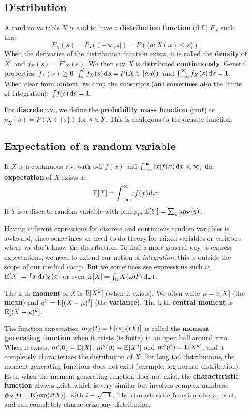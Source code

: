 \documentclass[twoside]{article}
\begin{document}
\subsection{Distribution}
A random variable $X$ is said to have a \textbf{distribution function} (d.f.) $F_X$
such that \[ F_X(s) = P_X((-\infty, s])=P(\{a: X(a)\leq s\}).\] When the derivative of the
distribution function exists, it is called the \textbf{density} of $X$, and
$f_X(s)=F'_X(s)$. We then say $X$ is distributed \textbf{continuously}. General
properties: $f_X(s)\geq0$, $\int_a^b f_X(s)\rd s = P(X\in[a,b])$, and
$\int_{-\infty}^\infty f_X(s) \rd s = 1$. When clear from context, we drop the
subscripts (and sometimes also the limits of integration): $\int\! f(s)\rd s=1$.

For \textbf{discrete} r.v., we define the \textbf{probability mass function} (pmf) as
$p_X(s) = P(X\in\{s\})$ for $s\in\mathcal{S}$. This is analogous to the density function.

\subsection{Expectation of a random variable}
If $X$ is a continuous r.v.
with pdf $f(x)$ and 
\(\int_{-\infty}^\infty |x|f(x) \rd x < \infty,\)
the \textbf{expectation} of $X$ exists as  
\[\E[X] = \int_{-\infty}^\infty xf(x) \rd x.\]
If $Y$ is a discrete random variable with pmf $p_Y$, 
$\operatorname{E}[Y]=\sum_y yp_Y(y)$.

Having different expressions for discrete and continuous random variables is awkward, since
sometimes we need to do theory for mixed variables or variables where we don't know the 
distribution. To find a more general way to express expectations, we need to extend
our notion of \emph{integration}, this is outside the scope of our method camp. But we sometimes
see expressions such at $\E[X]=\int\! x \rd F_X(x)$
or even $E[X]=\int_\Omega X(\omega) P(\rd \omega)$.

The k-th \textbf{moment} of $X$ is $\operatorname{E} [X^k]$ (when it exists).  We often write $\mu=\operatorname{E}[X]$ (the \textbf{mean}) and
$\sigma^2 = \operatorname{E}[(X-\mu)^2]$ (the \textbf{variance}). The k-th \textbf{central moment} 
is $\operatorname{E} [ (X-\mu)^k]$.

The function expectation $m_X(t)=\operatorname{E}[\exp(tX)]$ is called the \textbf{moment
generating function} when it exists (is finite) in an open ball around zero. When it exists,
$m'(0)=\operatorname{E}[X]$, $m''(0)=\operatorname{E}[X^2]$ and $m^k(0)=\operatorname{E}[X^k]$, and it completely
characterizes the distribution of $X$. For long tail distributions, the moment generating
functions does not exist (example: log-normal distribution). Even when the moment generating function
does not exist, the \textbf{characteristic function} always exist, which is very similar but
involves complex numbers: $\phi_X(t)= \operatorname{E}[\exp(i t X)]$, with  $i = \sqrt{-1}$. The characteristic
function always exist, and can completely characterize any distribution. 
\end{document}
